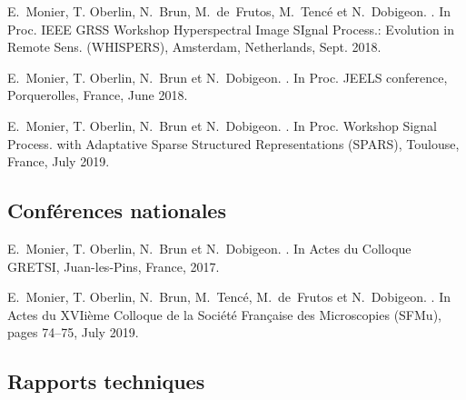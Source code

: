 \begin{fullwidth}
        E.~Monier, T. Oberlin, N.~Brun, M.~de~Frutos, M.~Tenc\'e et N.~Dobigeon.
        .
        \newblock In Proc. IEEE GRSS Workshop Hyperspectral Image SIgnal Process.:
          Evolution in Remote Sens. (WHISPERS), Amsterdam, Netherlands, Sept. 2018.

        E.~Monier, T. Oberlin, N.~Brun et N.~Dobigeon.
        .
        \newblock In Proc. JEELS conference, Porquerolles, France, June 2018.

        E.~Monier, T. Oberlin, N.~Brun et N.~Dobigeon.
        .
        \newblock In Proc. Workshop Signal Process. with Adaptative Sparse Structured
          Representations (SPARS), Toulouse, France, July 2019.

    
    \subsection*{Conférences nationales}  
    

        E.~Monier, T. Oberlin, N.~Brun et N.~Dobigeon.
        .
        \newblock In Actes du Colloque GRETSI, Juan-les-Pins, France, 2017.

        E.~Monier, T. Oberlin, N.~Brun, M.~Tenc\'e, M.~de~Frutos et N.~Dobigeon.
        .
        \newblock In Actes du XVIième Colloque de la Société Française des Microscopies (SFMu), pages 74--75, July 2019.


    
    \subsection*{Rapports techniques}


\end{fullwidth}
